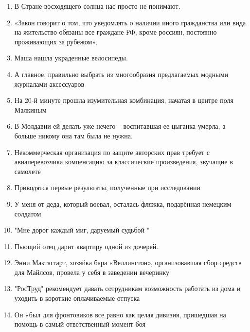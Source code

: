 \documentclass[paper=a4, fontsize=11pt]{scrartcl}
\begin{document}
\begin{enumerate}
    \item В Стране восходящего солнца нас просто не понимают.
    \item «Закон говорит о том, что уведомлять о наличии иного гражданства или вида на жительство обязаны все граждане РФ, кроме россиян, постоянно проживающих  за рубежом»,
    \item Маша нашла украденные велосипеды.
    \item А главное, правильно выбрать из многообразия предлагаемых модными журналами аксессуаров
    \item На 20-й минуте прошла изумительная комбинация, начатая в центре поля Малкиным
    \item В Молдавии ей делать уже нечего --  воспитавшая ее цыганка умерла, а больше никому она там была не нужна.
    \item Некоммерческая организация по защите авторских прав требует с авиаперевозчика компенсацию за классические произведения,  звучащие в самолете
    \item Приводятся первые результаты, полученные при исследовании
    \item У меня от деда, который воевал, осталась фляжка,  подарённая немецким солдатом
    \item "Мне дорог каждый миг, даруемый судьбой "
    \item  Пьющий отец дарит квартиру одной из дочерей.
    \item Энни Мактаггарт, хозяйка бара «Веллингтон»,  организовавшая сбор средств для Майлсов, провела у себя в заведении вечеринку
    \item "РосТруд" рекомендует давать сотрудникам возможность работать из дома и уходить в короткие оплачиваемые отпуска
    \item Он «был для фронтовиков все равно как целая дивизия, пришедшая на помощь в самый ответственный момент боя
\end{enumerate}
\end{document}
